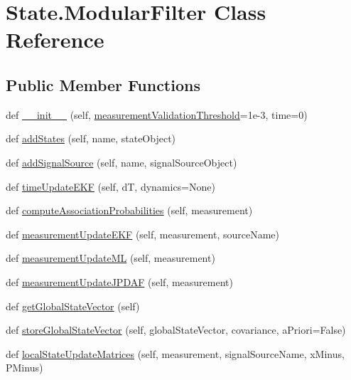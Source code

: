 \hypertarget{classState_1_1ModularFilter}{}\section{State.\+Modular\+Filter Class Reference}
\label{classState_1_1ModularFilter}
\subsection*{Public Member Functions}
\begin{DoxyCompactItemize}
\item 
def \hyperlink{classState_1_1ModularFilter_adfd8a992021bd65553e9def54c5dff3b}{\+\_\+\+\_\+init\+\_\+\+\_\+} (self, \hyperlink{classState_1_1ModularFilter_adf637093941f85a6ca14a122f232657a}{measurement\+Validation\+Threshold}=1e-\/3, time=0)
\item 
def \hyperlink{classState_1_1ModularFilter_adca05e3ee0d9fc67f136e9530a8cbc7e}{add\+States} (self, name, state\+Object)
\item 
def \hyperlink{classState_1_1ModularFilter_a1b349f50ec22b30eb007a014c045cc94}{add\+Signal\+Source} (self, name, signal\+Source\+Object)
\item 
def \hyperlink{classState_1_1ModularFilter_ac9d579bcc4e100cd46bbfc2a0c86e51a}{time\+Update\+E\+KF} (self, dT, dynamics=None)
\item 
def \hyperlink{classState_1_1ModularFilter_aa04c2b4d007a4bc5e98d5da00d6683ea}{compute\+Association\+Probabilities} (self, measurement)
\item 
def \hyperlink{classState_1_1ModularFilter_a1e6b78bdafffb5298fd6e5d2a022a878}{measurement\+Update\+E\+KF} (self, measurement, source\+Name)
\item 
def \hyperlink{classState_1_1ModularFilter_ac2d6be561f461f0501e451fc5be0811f}{measurement\+Update\+ML} (self, measurement)
\item 
def \hyperlink{classState_1_1ModularFilter_a0da499cc21acaf9753711553102b5469}{measurement\+Update\+J\+P\+D\+AF} (self, measurement)
\item 
def \hyperlink{classState_1_1ModularFilter_a6547493c7b2ad077dfae3e76b5619a0e}{get\+Global\+State\+Vector} (self)
\item 
def \hyperlink{classState_1_1ModularFilter_a3c510ca8c96da3b0e26215935e18beaa}{store\+Global\+State\+Vector} (self, global\+State\+Vector, covariance, a\+Priori=False)
\item 
def \hyperlink{classState_1_1ModularFilter_a90d6a9c3ae7a248577d4be06dd58a0c8}{local\+State\+Update\+Matrices} (self, measurement, signal\+Source\+Name, x\+Minus, P\+Minus)
\end{DoxyCompactItemize}
